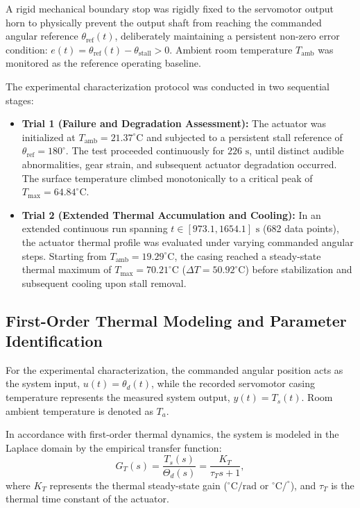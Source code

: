 \documentclass[lettersize,journal]{IEEEtran}
\begin{document}
A rigid mechanical boundary stop was rigidly fixed to the servomotor output horn to physically prevent the output shaft from reaching the commanded angular reference $\theta_{\text{ref}}(t)$, deliberately maintaining a persistent non-zero error condition: $e(t) = \theta_{\text{ref}}(t) - \theta_{\text{stall}} > 0$. Ambient room temperature $T_{\text{amb}}$ was monitored as the reference operating baseline.

The experimental characterization protocol was conducted in two sequential stages:
\begin{itemize}
\item \textbf{Trial 1 (Failure and Degradation Assessment):} The actuator was initialized at $T_{\text{amb}} = 21.37^\circ\text{C}$ and subjected to a persistent stall reference of $\theta_{\text{ref}} = 180^\circ$. The test proceeded continuously for $226\text{ s}$, until distinct audible abnormalities, gear strain, and subsequent actuator degradation occurred. The surface temperature climbed monotonically to a critical peak of $T_{\max} = 64.84^\circ\text{C}$.
\item \textbf{Trial 2 (Extended Thermal Accumulation and Cooling):} In an extended continuous run spanning $t \in [973.1, 1654.1]\text{ s}$ (682 data points), the actuator thermal profile was evaluated under varying commanded angular steps. Starting from $T_{\text{amb}} = 19.29^\circ\text{C}$, the casing reached a steady-state thermal maximum of $T_{\max} = 70.21^\circ\text{C}$ ($\Delta T = 50.92^\circ\text{C}$) before stabilization and subsequent cooling upon stall removal.
\end{itemize}

\subsection{First-Order Thermal Modeling and Parameter Identification}
\label{sec:thermal_modeling}

For the experimental characterization, the commanded angular position acts as the system input, $u(t) = \theta_d(t)$, while the recorded servomotor casing temperature represents the measured system output, $y(t) = T_s(t)$. Room ambient temperature is denoted as $T_a$.

In accordance with first-order thermal dynamics, the system is modeled in the Laplace domain by the empirical transfer function:
\begin{equation}
G_T(s) = \frac{T_s(s)}{\Theta_d(s)} = \frac{K_T}{\tau_T s + 1},
\label{eq:transfer_function}
\end{equation}
where $K_T$ represents the thermal steady-state gain ($^\circ\text{C}/\text{rad}$ or $^\circ\text{C}/^\circ$), and $\tau_T$ is the thermal time constant of the actuator.
\end{document}
